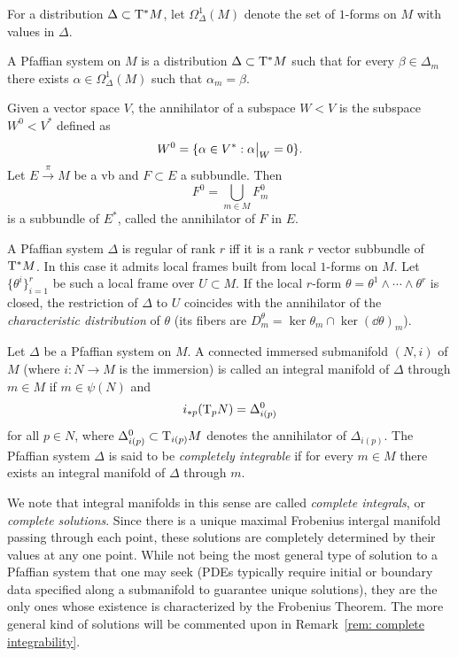 For a distribution $\Delta\subset \mathrm{T}^\ast M$, let $\Omega^1_\Delta(M)$ denote the set of $1$-forms on $M$ with values in $\Delta$.

\begin{defn}
    A Pfaffian system on $M$ is a distribution $\Delta\subset \mathrm{T}^\ast M$ such that for every $\beta\in\Delta_m$ there exists $\alpha\in\Omega^1_\Delta(M)$ such that $\alpha_m=\beta$.
\end{defn}

\begin{defn}[Annihilator]
    Given a vector space $V$, the annihilator of a subspace $W<V$ is the subspace $W^0<V^\ast$ defined as
    \[W^0=\{\alpha\in V^\ast: \restr{\alpha}{W}=0 \}.\]
    Let $E\overset{\pi}{\to}M$ be a \gls{vb} and $F\subset E$ a subbundle. Then
    \[F^0=\bigcup_{m\in M}F_m^0\]
    is a subbundle of $E^\ast$, called the annihilator of $F$ in $E$.
\end{defn}


\begin{rem}
    A Pfaffian system $\Delta$ is regular of rank $r$ iff it is a rank $r$ vector subbundle of $\mathrm{T}^\ast M$. In this case it admits local frames built from local $1$-forms on $M$. Let $\{\theta^i\}_{i=1}^r$ be such a local frame over $U\subset M$. If the local $r$-form $\theta=\theta^1\wedge\cdots\wedge\theta^r$ is closed, the restriction of $\Delta$ to $U$ coincides with the annihilator of the \emph{characteristic distribution} of $\theta$ (its fibers are $D^\theta_m=\ker\theta_m\cap \ker(\dd\theta)_m$).
\end{rem}

\begin{defn}
    Let $\Delta$ be a Pfaffian system on $M$. A connected immersed submanifold $(N,i)$ of $M$ (where $i:N\to M$ is the immersion) is called an integral manifold of $\Delta$ through $m\in M$ if $m\in\psi(N)$ and 
    \[i_{\ast p}(\mathrm{T}_pN)=\Delta_{i(p)}^0\]
    for all $p\in N$, where $\Delta_{i(p)}^0\subset \mathrm{T}_{i(p)}M$ denotes the annihilator of $\Delta_{i(p)}$. The Pfaffian system $\Delta$ is said to be \emph{completely integrable} if for every $m\in M$ there exists an integral manifold of $\Delta$ through $m$.
\end{defn}

We note that integral manifolds in this sense are called \emph{complete integrals}, or \emph{complete solutions}. Since there is a unique maximal Frobenius intergal manifold passing through each point, these solutions are completely determined by their values at any one point. While not being the most general type of solution to a Pfaffian system that one may seek (PDEs typically require initial or boundary data specified along a submanifold to guarantee unique solutions), they are the only ones whose existence is characterized by the Frobenius Theorem. The more general kind of solutions will be commented upon in Remark~\ref{rem: complete integrability}.

